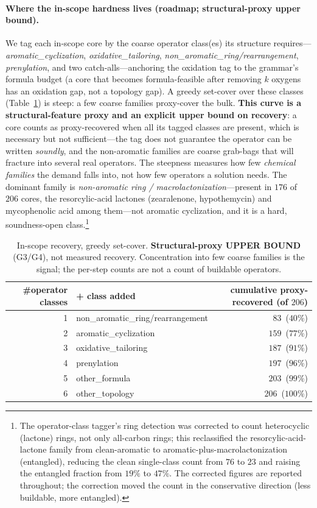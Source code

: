 \documentclass[11pt]{article}
\begin{document}
\paragraph{Where the in-scope hardness lives (roadmap; structural-proxy upper bound).} We tag each
in-scope core by the coarse operator class(es) its structure requires---\emph{aromatic\_cyclization},
\emph{oxidative\_tailoring}, \emph{non\_aromatic\_ring/rearrangement}, \emph{prenylation}, and two
catch-alls---anchoring the oxidation tag to the grammar's formula budget (a core that becomes
formula-feasible after removing $k$ oxygens has an oxidation gap, not a topology gap). A greedy
set-cover over these classes (Table~\ref{tab:cover}) is steep: a few coarse families proxy-cover the
bulk. \textbf{This curve is a structural-feature proxy and an explicit upper bound on recovery}: a core
counts as proxy-recovered when all its tagged classes are present, which is necessary but not
sufficient---the tag does not guarantee the operator can be written \emph{soundly}, and the
non-aromatic families are coarse grab-bags that will fracture into several real operators. The
steepness measures how few \emph{chemical families} the demand falls into, not how few operators a
solution needs. The dominant family is \emph{non-aromatic ring / macrolactonization}---present in $176$
of $206$ cores, the resorcylic-acid lactones (zearalenone, hypothemycin) and mycophenolic acid among
them---not aromatic cyclization, and it is a hard, soundness-open class.\footnote{The operator-class
tagger's ring detection was corrected to count heterocyclic (lactone) rings, not only all-carbon
rings; this reclassified the resorcylic-acid-lactone family from clean-aromatic to
aromatic-plus-macrolactonization (entangled), reducing the clean single-class count from $76$ to $23$
and raising the entangled fraction from $19\%$ to $47\%$. The corrected figures are reported
throughout; the correction moved the count in the conservative direction (less buildable, more
entangled).}

\begin{table}[t]\centering\small
\begin{tabular}{rlr}
\toprule
\#operator classes & + class added & cumulative proxy-recovered (of $206$) \\
\midrule
1 & non\_aromatic\_ring/rearrangement  & $83$  \,($40\%$) \\
2 & aromatic\_cyclization              & $159$ \,($77\%$) \\
3 & oxidative\_tailoring               & $187$ \,($91\%$) \\
4 & prenylation                        & $197$ \,($96\%$) \\
5 & other\_formula                     & $203$ \,($99\%$) \\
6 & other\_topology                    & $206$ \,($100\%$) \\
\bottomrule
\end{tabular}
\caption{In-scope recovery, greedy set-cover. \textbf{Structural-proxy UPPER BOUND} (G3/G4),
not measured recovery. Concentration into few coarse families is the signal; the per-step counts
are not a count of buildable operators.}
\label{tab:cover}
\end{table}
\end{document}
